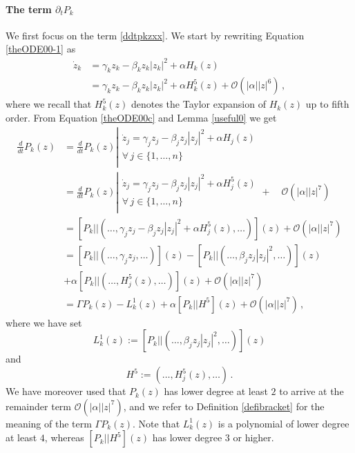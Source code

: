 \documentclass[12pt]{article}
\renewcommand{\mathcal}{\mathscr}
\theoremstyle{plain}
\theoremstyle{definition}
\theoremstyle{remark}
\theoremstyle{remark}
\begin{document}
\paragraph{The term $\partial_tP_k$}\label{firstterm} 

\noindent We first focus on the term \eqref{ddtpkzxx}. We start by rewriting Equation \eqref{theODE00-1} as
\begin{align}\label{theODE00c}
\dot{z}_k   &= \gamma_kz_k - \beta_k z_k|z_k|^2 + \alpha H_k(z) \\ \nonumber
            &= \gamma_kz_k - \beta_k z_k|z_k|^2 + \alpha{H}^5_k(z)  + \mathcal{O}(|\alpha||z|^6)\, ,
\end{align}
where we recall that ${H}^5_k(z)$ denotes the Taylor expansion of $H_k(z)$ up to fifth order. 
From Equation \eqref{theODE00c} and Lemma \ref{useful0} we get
\begin{align}\label{part1of1}
\frac{d}{dt}P_k(z) &= \frac{d}{dt}P_k(z)\left|{\begin{array}{l}
  \dot{z}_j =  \gamma_jz_j - \beta_j z_j|z_j|^2 + \alpha {H}_j(z)\\
   \forall \, j \in 
   \{1, \dots, n\} \\
\end{array}}\right. \\ \nonumber
&= \frac{d}{dt}P_k(z)\left|{\begin{array}{l}
  \dot{z}_j =  \gamma_jz_j - \beta_j z_j|z_j|^2 + \alpha {H}^5_j(z)\\
   \forall \, j \in 
   \{1, \dots, n\} \\
\end{array}}\right. + \quad \mathcal{O}(|\alpha||z|^7) \\ \nonumber
&= [P_k||(\dots, \gamma_jz_j - \beta_j z_j|z_j|^2 + \alpha {H}^5_j(z), \dots)](z) + \mathcal{O}(|\alpha||z|^7) \\ \nonumber
&= [P_k||(\dots, \gamma_jz_j, \dots)](z) -[P_k|| (\dots, \beta_j z_j|z_j|^2, \dots)](z) \\ \nonumber
&+ \alpha [P_k|| (\dots, {H}^5_j(z), \dots)](z) + \mathcal{O}(|\alpha||z|^7) \\ \nonumber
&= \Gamma P_k(z) - L^1_k(z) + \alpha [P_k|| {H}^5](z) + \mathcal{O}(|\alpha||z|^7) \, ,
\end{align}
where we have set 
\[L^1_k(z) :=  [P_k|| (\dots, \beta_j z_j|z_j|^2, \dots)](z) \] and
\[{H}^5 := (\dots, {H}^5_j(z), \dots) \, .\] 
We have moreover used that $P_k(z)$ has lower degree at least $2$ to arrive at the remainder term  $\mathcal{O}(|\alpha||z|^7)$, and we refer to Definition \ref{defibracket} for the meaning of the term $\Gamma P_k(z)$. Note that $L^1_k(z)$ is a polynomial of lower degree at least $4$, whereas $[P_k|| {H}^5](z)$ has lower degree $3$ or higher.
\end{document}
